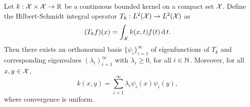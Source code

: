 Let \(k : \mathcal{X} \times \mathcal{X} \to \mathbb{R}\) be a continuous bounded kernel on a compact set \(\mathcal{X}\).
Define the Hilbert-Schmidt integral operator \(T_k : L^2(\mathcal{X}) \to L^2(\mathcal{X})\) as
\begin{equation}
    (T_k f)(x) = \int_{\mathcal{X}} k(x, t) f(t) \operatorname{d} t.
\end{equation}
Then there exists an orthonormal basis \(\{\psi_{i}\}_{i=1}^\infty\) of eigenfunctions of \(T_k\) and corresponding eigenvalues \((\lambda_i)_{i=1}^\infty\) with \(\lambda_i \geq 0\), for all \(i \in \mathbb{N}\).
Moreover, for all \(x,y \in \mathcal{X}\),
\begin{equation}
    \label{eqn:kernel-decomposition}
    k(x,y) = \sum_{i=1}^{\infty} \lambda_i \psi_i(x) \psi_i(y),
\end{equation}
where convergence is uniform.